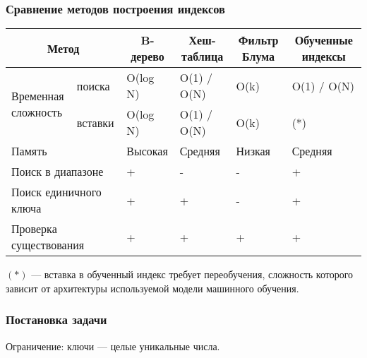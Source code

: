 \documentclass[8pt,table]{bmstu-pr}
\begin{document}
\begin{frame}
    \fontsize{22pt}{22pt}\selectfont
    \frametitle{Сравнение методов построения индексов}

{
\fontsize{20pt}{20pt}\selectfont
\renewcommand{\arraystretch}{1.5}
\begin{longtable}[Hc]{|p{4cm}|p{1.5cm}|p{3cm}|p{4cm}|p{2.5cm}|p{4cm}|}
    \hline
    \multicolumn{2}{|c|}{\textbf{Метод}} &
    \multicolumn{1}{c|}{\textbf{B-дерево}} &
    \multicolumn{1}{c|}{\textbf{Хеш-таблица}} &
    \multicolumn{1}{c|}{\parbox{2.5cm}{\centering\textbf{Фильтр Блума}}} &
    \multicolumn{1}{c|}{\parbox{4cm}{\centering\textbf{Обученные индексы}}}\\
    \hline
    \multirow{2}{*}{\parbox{2cm}{Временная\\сложность}} &
    поиска & O(log N) & O(1) / O(N) & O(k) & O(1) / O(N)\\
    \cline{2-6}
    & вставки & O(log N) & O(1) / O(N) & O(k) & (*)\\
    \hline
    \multicolumn{2}{|l|}{Память} & Высокая & Средняя & Низкая & Средняя\\
    \hline
    \multicolumn{2}{|l|}{Поиск в диапазоне} & + & - & - & + \\
    \hline
    \multicolumn{2}{|l|}{Поиск единичного ключа} & + & + & - & + \\
    \hline
    \multicolumn{2}{|l|}{Проверка существования} & + & + & + & + \\
    \hline
\end{longtable}
}

$(*)$ --- вставка в обученный индекс требует переобучения, сложность которого
зависит от архитектуры используемой модели машинного обучения.

\end{frame}

\begin{frame}
    \fontsize{22pt}{22pt}\selectfont
    \frametitle{Постановка задачи}

    Ограничение: ключи --- целые уникальные числа.
\end{frame}
\end{document}
